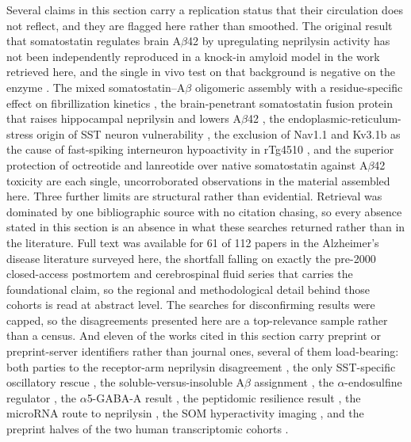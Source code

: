 \documentclass[11pt]{article}
\begin{document}
Several claims in this section carry a replication status that their circulation does not reflect, and they are flagged here rather than smoothed. The original result that somatostatin regulates brain A$\beta$42 by upregulating neprilysin activity \citep{Saito2005} has not been independently reproduced in a knock-in amyloid model in the work retrieved here, and the single in vivo test on that background is negative on the enzyme \citep{Williams2023}. The mixed somatostatin--A$\beta$ oligomeric assembly with a residue-specific effect on fibrillization kinetics \citep{Solarski2018}, the brain-penetrant somatostatin fusion protein that raises hippocampal neprilysin and lowers A$\beta$42 \citep{Rofo2021}, the endoplasmic-reticulum-stress origin of SST neuron vulnerability \citep{Tomoda2022}, the exclusion of Nav1.1 and Kv3.1b as the cause of fast-spiking interneuron hypoactivity in rTg4510 \citep{Kudo2023}, and the superior protection of octreotide and lanreotide over native somatostatin against A$\beta$42 toxicity \citep{Pham2025} are each single, uncorroborated observations in the material assembled here. Three further limits are structural rather than evidential. Retrieval was dominated by one bibliographic source with no citation chasing, so every absence stated in this section is an absence in what these searches returned rather than in the literature. Full text was available for 61 of 112 papers in the Alzheimer's disease literature surveyed here, the shortfall falling on exactly the pre-2000 closed-access postmortem and cerebrospinal fluid series that carries the foundational claim, so the regional and methodological detail behind those cohorts is read at abstract level. The searches for disconfirming results were capped, so the disagreements presented here are a top-relevance sample rather than a census. And eleven of the works cited in this section carry preprint or preprint-server identifiers rather than journal ones, several of them load-bearing: both parties to the receptor-arm neprilysin disagreement \citep{Nilsson2020,Williams2022}, the only SST-specific oscillatory rescue \citep{Chung2018}, the soluble-versus-insoluble A$\beta$ assignment \citep{Sasaguri2021}, the $\alpha$-endosulfine regulator \citep{Watamura2020}, the $\alpha$5-GABA-A result \citep{Dharavath2024}, the peptidomic resilience result \citep{Morgan2024b}, the microRNA route to neprilysin \citep{Wang2026}, the SOM hyperactivity imaging \citep{Algamal2022b}, and the preprint halves of the two human transcriptomic cohorts \citep{Consens2022a,Castanho2025a}.
\end{document}
